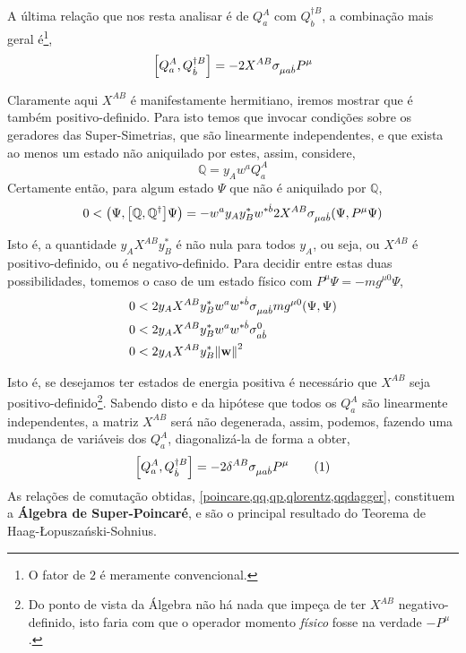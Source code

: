 A última relação que nos resta analisar é de $Q_a^A$ com $Q_{\dot b}^{\dagger B}$, a combinação mais geral é\footnote{O fator de $2$ é meramente convencional.},
\[\comm{Q_a^A}{Q_{\dot b}^{\dagger B}}=-2X^{AB}\sigma_{\mu a\dot b}P^\mu\]

Claramente aqui $X^{AB}$ é manifestamente hermitiano, iremos mostrar que é também positivo-definido. Para isto temos que invocar 
condições sobre os geradores das Super-Simetrias, que são linearmente independentes, e que exista ao menos um estado não aniquilado por estes, assim, considere,
\[\mathbb Q=y_Aw^aQ_a^A\]
Certamente então, para algum estado $\Psi$ que não é aniquilado por $\mathbb Q$,
\begin{align*}
    0<\qty(\Psi,\comm{\mathbb Q}{\mathbb Q^\dagger}\Psi)=-w^ay_Ay_B^\ast w^{\ast\dot b}2X^{AB}\sigma_{\mu a\dot b}\qty(\Psi,P^\mu\Psi)
\end{align*}

Isto é, a quantidade $y_AX^{AB}y^\ast_B$ é não nula para todos $y_A$, ou seja, ou $X^{AB}$ é positivo-definido, ou é negativo-definido. Para decidir entre estas duas 
possibilidades, tomemos o caso de um estado físico com $P^\mu\Psi=-mg^{\mu 0}\Psi$,
\begin{align*}
    0&<2y_AX^{AB}y_B^\ast w^aw^{\ast\dot b}\sigma_{\mu a\dot b}mg^{\mu 0}\qty(\Psi,\Psi)\\
    0&<2y_AX^{AB}y_B^\ast w^aw^{\ast\dot b}{\sigma}^0_{ a\dot b}\\
    0&<2y_AX^{AB}y_B^\ast\norm{\vb w}^2
\end{align*}

Isto é, se desejamos ter estados de energia positiva é necessário que $X^{AB}$ seja positivo-definido\footnote{Do ponto de vista da Álgebra 
não há nada que impeça de ter $X^{AB}$ negativo-definido, isto faria com que o operador momento \textit{físico} fosse na verdade $-P^\mu$.}. 
Sabendo disto e da hipótese que todos os $Q^A_a$ são linearmente independentes, a matriz $X^{AB}$ será não degenerada, assim, podemos, 
fazendo uma mudança de variáveis dos $Q^A_a$, diagonalizá-la de forma a obter,
\[\comm{Q^A_a}{Q_{\dot b}^{\dagger B}}=-2\delta^{AB}\sigma_{\mu a\dot b}P^\mu\numberthis\label{qqdagger}\]
As relações de comutação obtidas, \cref{poincare,qq,qp,qlorentz,qqdagger}, constituem a \textbf{Álgebra de Super-Poincaré}, e são o principal 
resultado do Teorema de Haag-Łopuszański-Sohnius.